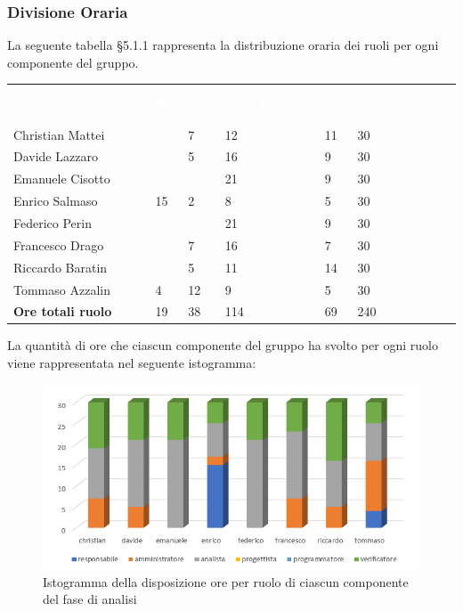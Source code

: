 \subsubsection{Divisione Oraria}
La seguente tabella §5.1.1 rappresenta la distribuzione oraria dei ruoli per ogni componente del gruppo.
{
	\renewcommand{\arraystretch}{2}
	\centering
	\begin{longtable}{ C{5cm} C{1cm} C{1cm} C{1cm} C{1cm} C{1cm} C{1cm} C{3cm}}
		\textcolor{white}{\textbf{Nome membro del gruppo}} & \textcolor{white}{\textbf{RE}} & \textcolor{white}{\textbf{AM}} & \textcolor{white}{\textbf{AN}} & \textcolor{white}{\textbf{PT}} & \textcolor{white}{\textbf{PR}} & \textcolor{white}{\textbf{VE}} & \textcolor{white}{\textbf{Ore complessive}}\\	
        
        
        Christian Mattei     &  & 7 & 12 &  & & 11 & 30 \\
		Davide Lazzaro       &  & 5 & 16 &  &  & 9 & 30 \\
        Emanuele Cisotto     &  &  & 21 &  &  & 9 & 30 \\
        Enrico Salmaso       & 15 & 2 & 8  &  &  & 5 & 30 \\
        Federico Perin       &  &  & 21 &  &  & 9 & 30 \\
        Francesco Drago      &  & 7 & 16 &  &  & 7 & 30 \\
        Riccardo Baratin     &  & 5 & 11 &  &  & 14 & 30 \\
        Tommaso Azzalin      & 4 & 12 & 9  &  &  & 5 & 30 \\
        \textbf{Ore totali ruolo} & 19 & 38 & 114 &  &  & 69 & 240 \\
		
	\end{longtable}
}

La quantità di ore che ciascun componente del gruppo ha svolto per ogni ruolo viene rappresentata nel seguente istogramma:

\begin{figure}[h]
	\centering
	\includegraphics[scale=2]{sezioni/Istogrammi/IstogrammaAnalisi.png}
	\caption{Istogramma della disposizione ore per ruolo di ciascun componente del fase di analisi}
\end{figure}

